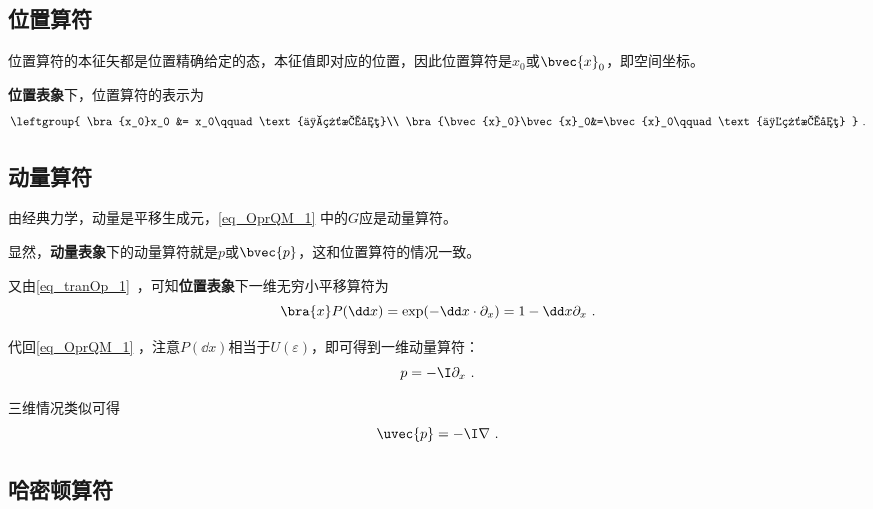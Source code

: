 \subsection{位置算符}

位置算符的本征矢都是位置精确给定的态，本征值即对应的位置，因此位置算符是$x_0$或$\bvec{x}_0$，即空间坐标。

\textbf{位置表象}下，位置算符的表示为
\begin{equation}
\leftgroup{
    \bra{x_0}x_0 &= x_0\qquad\text{一维情况}\\
    \bra{\bvec{x}_0}\bvec{x}_0&=\bvec{x}_0\qquad\text{三维情况}
    }~.
\end{equation}







\subsection{动量算符}


由经典力学，动量是平移生成元，\autoref{eq_OprQM_1} 中的$G$应是动量算符。

显然，\textbf{动量表象}下的动量算符就是$p$或$\bvec{p}$，这和位置算符的情况一致。

又由\autoref{eq_tranOp_1}~，可知\textbf{位置表象}下一维无穷小平移算符为
\begin{equation}
\bra{x}P(\dd x) = \exp(-\dd x \cdot \partial_x) = 1-\dd x\partial_x~.
\end{equation}

代回\autoref{eq_OprQM_1} ，注意$P(\dd x)$相当于$U(\varepsilon)$，即可得到一维动量算符：
\begin{equation}
p  = -\I\partial_x~.
\end{equation}

三维情况类似可得
\begin{equation}
\uvec{p} = -\I\nabla~.
\end{equation}




\subsection{哈密顿算符}

